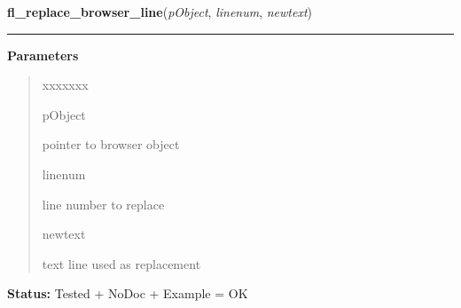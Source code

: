 \hspace{.8\funcindent}\begin{boxedminipage}{\funcwidth}

    \raggedright \textbf{fl\_replace\_browser\_line}(\textit{pObject}, \textit{linenum}, \textit{newtext})

    \vspace{-1.5ex}

    \rule{\textwidth}{0.5\fboxrule}
\setlength{\parskip}{2ex}
\setlength{\parskip}{1ex}
      \textbf{Parameters}
      \vspace{-1ex}

      \begin{quote}
        \begin{Ventry}{xxxxxxx}

          \item[pObject]

          pointer to browser object

          \item[linenum]

          line number to replace

          \item[newtext]

          text line used as replacement

        \end{Ventry}

      \end{quote}

\textbf{Status:} Tested + NoDoc + Example = OK



    \end{boxedminipage}

    \label{xformslib:library:fl_get_browser_line}

    \vspace{0.5ex}

